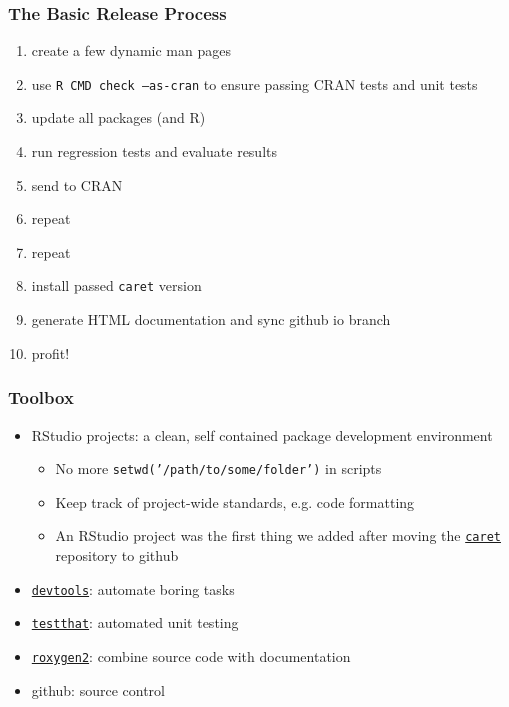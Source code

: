 \documentclass[12 pt]{beamer}\usepackage[]{graphicx}\usepackage[]{color}
\newcommand{\pkg}[1]{{\fontseries{b}\selectfont #1}}
\renewcommand{\pkg}[1]{{\color{darkgreen}\texttt{#1}}}
\begin{document}

  \begin{frame}[fragile]
\frametitle{The Basic Release Process}

\begin{enumerate}
  \item create a few dynamic man pages
  \item use {\color{darkred} \texttt{R CMD check --as-cran}} to ensure passing CRAN tests and {\color{darkred} unit tests}
  \item update all packages (and R)
  \item run {\color{darkred} regression tests} and evaluate results
  \item send to CRAN
  \item repeat
  \item repeat
  \item install passed \pkg{caret} version
  \item generate {\color{darkred} HTML documentation} and sync github io branch
  \item profit!
\end{enumerate}

\end{frame}



  \begin{frame}[fragile]
\frametitle{Toolbox}

\begin{itemize}
\item RStudio projects: a clean, self contained package development environment
  \begin{itemize}
  \item  No more {\tt setwd('/path/to/some/folder')} in scripts
  \item Keep track of project-wide standards, e.g. code formatting
  \item An RStudio project was the first thing we added after moving the \href{http://cran.r-project.org/web/packages/caret/index.html}{\pkg{caret}} repository to github
  \end{itemize}
\item \href{http://cran.r-project.org/web/packages/devtools/index.html}{\pkg{devtools}}: automate boring tasks
\item \href{http://cran.r-project.org/web/packages/testthat/index.html}{\pkg{testthat}}: automated unit testing
\item \href{http://cran.r-project.org/web/packages/roxygen2/index.html}{\pkg{roxygen2}}: combine source code with documentation
\item github: source control
\end{itemize}


\end{frame}
\end{document}
